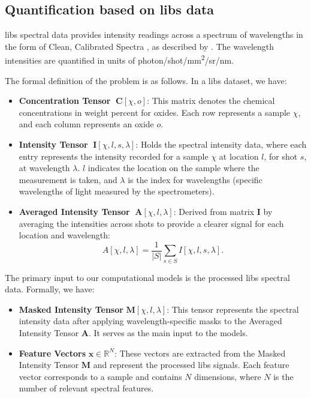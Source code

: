 \subsection{Quantification based on \gls{libs} data}\label{subsec:quantification}
\gls{libs} spectral data provides intensity readings across a spectrum of wavelengths in the form of Clean, Calibrated Spectra \cite{andersonImprovedAccuracyQuantitative2017}, as described by \citet{wiensPreflightCalibrationInitial2013}.
The wavelength intensities are quantified in units of photon/shot/mm\textsuperscript{2}/sr/nm.

The formal definition of the problem is as follows.
In a \gls{libs} dataset, we have:
\begin{itemize}[topsep=0pt]
    \item \textbf{Concentration Tensor} $\;\mathbf{C}[\chi, o]$: This matrix denotes the chemical concentrations in weight percent for oxides. Each row represents a sample $\chi$, and each column represents an oxide $o$.
    \label{matrix:concentration}

    \item \textbf{Intensity Tensor} $\;\mathbf{I}[\chi, l, s, \lambda]$: Holds the spectral intensity data, where each entry represents the intensity recorded for a sample $\chi$ at location $l$, for shot $s$, at wavelength $\lambda$. $l$ indicates the location on the sample where the measurement is taken, and $\lambda$ is the index for wavelengths (specific wavelengths of light measured by the spectrometers).
    \label{matrix:intensity}

    \item \textbf{Averaged Intensity Tensor} $\;\mathbf{A}[\chi, l, \lambda]$: Derived from matrix $\mathbf{I}$ by averaging the intensities across shots to provide a clearer signal for each location and wavelength:
    \[
    A[\chi, l, \lambda] = \frac{1}{|S|} \sum_{s \in S} I[\chi, l, s, \lambda].
    \]
    \label{matrix:averaged_intensity}
\end{itemize}

The primary input to our computational models is the processed \gls{libs} spectral data.
Formally, we have:
\begin{itemize}
    \item \textbf{Masked Intensity Tensor} $\mathbf{M}[\chi, l, \lambda]$: This tensor represents the spectral intensity data after applying wavelength-specific masks to the Averaged Intensity Tensor $\mathbf{A}$. It serves as the main input to the models.
    \item \textbf{Feature Vectors} $\mathbf{x} \in \mathbb{R}^N$: These vectors are extracted from the Masked Intensity Tensor $\mathbf{M}$ and represent the processed \gls{libs} signals. Each feature vector corresponds to a sample and contains $N$ dimensions, where $N$ is the number of relevant spectral features.
\end{itemize}

